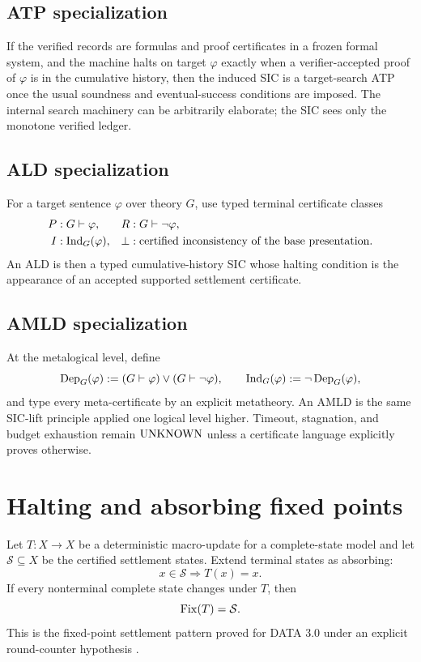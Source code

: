\subsection{ATP specialization}
If the verified records are formulas and proof certificates in a frozen formal system, and the machine halts on target $\varphi$ exactly when a verifier-accepted proof of $\varphi$ is in the cumulative history, then the induced SIC is a target-search ATP once the usual soundness and eventual-success conditions are imposed. The internal search machinery can be arbitrarily elaborate; the SIC sees only the monotone verified ledger.

\subsection{ALD specialization}
For a target sentence $\varphi$ over theory $G$, use typed terminal certificate classes
\[
\begin{aligned}
P&:G\vdash\varphi, & R&:G\vdash\neg\varphi,\\
I&:\operatorname{Ind}_G(\varphi), & \bot&:\text{certified inconsistency of the base presentation}.
\end{aligned}
\]
An ALD is then a typed cumulative-history SIC whose halting condition is the appearance of an accepted supported settlement certificate.

\subsection{AMLD specialization}
At the metalogical level, define
\[
\operatorname{Dep}_G(\varphi):=(G\vdash\varphi)\lor(G\vdash\neg\varphi),
\qquad
\operatorname{Ind}_G(\varphi):=\neg\operatorname{Dep}_G(\varphi),
\]
and type every meta-certificate by an explicit metatheory. An AMLD is the same SIC-lift principle applied one logical level higher. Timeout, stagnation, and budget exhaustion remain $\mathrm{UNKNOWN}$ unless a certificate language explicitly proves otherwise.

\section{Halting and absorbing fixed points}
Let $T:X\to X$ be a deterministic macro-update for a complete-state model and let $\mathcal S\subseteq X$ be the certified settlement states. Extend terminal states as absorbing:
\[
x\in\mathcal S\Longrightarrow T(x)=x.
\]
If every nonterminal complete state changes under $T$, then
\[
\operatorname{Fix}(T)=\mathcal S.
\]
This is the fixed-point settlement pattern proved for DATA 3.0 under an explicit round-counter hypothesis \cite{data3}.

